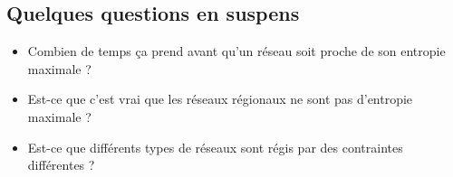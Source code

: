\subsection{Quelques questions en suspens} 

\begin{itemize}
    \item Combien de temps ça prend avant qu'un réseau soit proche de son entropie maximale ?
    \item Est-ce que c'est vrai que les réseaux régionaux ne sont pas d'entropie maximale ?
    \item Est-ce que différents types de réseaux sont régis par des contraintes différentes ?
\end{itemize}


\endinput
